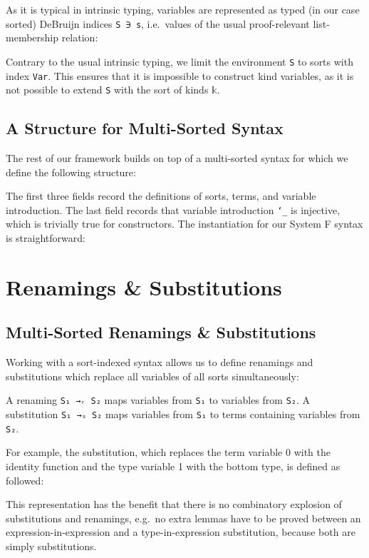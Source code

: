 \documentclass[sigplan,10pt]{acmart}
\newenvironment{LibCode*}{%
  \begin{tcolorbox}[%
    colframe=white,%
    boxrule=0.0pt,%
    top=2.5pt,%
    left=2.5pt,%
    bottom=2.5pt,%
    right=2.5pt,%
    boxsep=0pt%
  ]\vspace{-0.2\baselineskip}%
}{%
  \vspace{-1\baselineskip}%
  \end{tcolorbox}%
}
\newenvironment{ExampleCode*}{%
  \begin{tcolorbox}[%
    colframe=white,%
    colback=yellow!5,%
    boxrule=0.0pt,%
    top=2.5pt,%
    left=2.5pt,%
    bottom=2.5pt,%
    right=2.5pt,%
    boxsep=0pt%
  ]\vspace{-0.2\baselineskip}%
}{%
  \vspace{-1\baselineskip}%
  \end{tcolorbox}%
}
\newcommand*\LibCode[1]{\begin{LibCode*}{#1}\end{LibCode*}}
\newcommand*\AppCode[1]{{#1}}
\newcommand*\ExampleCode[1]{\begin{ExampleCode*}{#1}\end{ExampleCode*}}
\begin{document}
  As it is typical in intrinsic typing, variables are represented as
  typed (in our case sorted) DeBruijn indices \texttt{S~∋~s}, i.e.\
  values of the usual proof-relevant list-membership relation:
  \LibCode\KVariables

  Contrary to the usual intrinsic typing, we limit the environment
  \texttt{S} to sorts with index \texttt{Var}.
  This ensures that it is impossible to construct kind variables, as
  it is not possible to extend \texttt{S} with the sort of kinds
  \texttt{𝕜}.

  \subsection{A Structure for Multi-Sorted Syntax}
  The rest of our framework builds on top of a multi-sorted
  syntax for which we define the following structure:
  \LibCode\KTerms
  The first three fields record the definitions of sorts, terms, and variable introduction.
  The last field records that variable introduction
  \texttt{`\_} is injective, which is trivially true for
  constructors. The instantiation for our System F syntax is
  straightforward:
  \AppCode\FTerms

  \section{Renamings \& Substitutions}
  \subsection{Multi-Sorted Renamings \& Substitutions}
  Working with a sort-indexed syntax allows us to define renamings and substitutions
  which replace all variables of all sorts simultaneously:

  \ExampleCode\FExampleSubRen

  A renaming \texttt{S₁ →ᵣ S₂} maps variables from \texttt{S₁} to
  variables from \texttt{S₂}.
  A substitution \texttt{S₁ →ₛ S₂} maps variables from \texttt{S₁} to
  terms containing variables from \texttt{S₂}.

  For example, the substitution, which replaces the term variable 0 with the
  identity function and the type variable 1 with the bottom type, is defined
  as followed:
  \ExampleCode\FExampleSub

  This representation has the benefit that there is no combinatory
  explosion of substitutions and renamings, e.g.\ no extra lemmas have to be
  proved between an expression-in-expression and a type-in-expression
  substitution, because both are simply substitutions.
\end{document}
